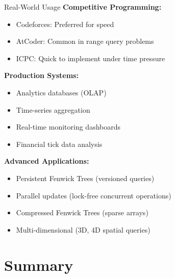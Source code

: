 \documentclass[aspectratio=169]{beamer}
\begin{document}
\begin{frame}{Real-World Usage}
  \textbf{Competitive Programming:}
  \begin{itemize}
    \item Codeforces: Preferred for speed
    \item AtCoder: Common in range query problems
    \item ICPC: Quick to implement under time pressure
  \end{itemize}

  \vspace{0.5cm}
  \textbf{Production Systems:}
  \begin{itemize}
    \item Analytics databases (OLAP)
    \item Time-series aggregation
    \item Real-time monitoring dashboards
    \item Financial tick data analysis
  \end{itemize}

  \vspace{0.5cm}
  \textbf{Advanced Applications:}
  \begin{itemize}
    \item Persistent Fenwick Trees (versioned queries)
    \item Parallel updates (lock-free concurrent operations)
    \item Compressed Fenwick Trees (sparse arrays)
    \item Multi-dimensional (3D, 4D spatial queries)
  \end{itemize}
\end{frame}

\section{Summary}
\end{document}
